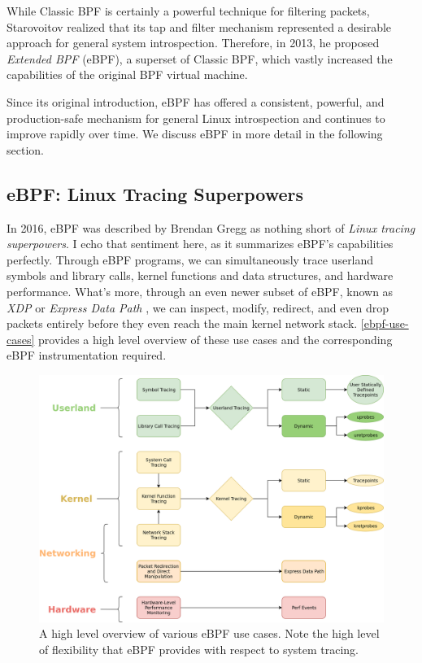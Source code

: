 \documentclass[
  12pt]{findlay}
\begin{document}
While Classic BPF is certainly a powerful technique for filtering
packets, Starovoitov \autocite{starovoitov13} realized that its tap and
filter mechanism represented a desirable approach for general system
introspection. Therefore, in 2013, he proposed \emph{Extended BPF}
(eBPF), a superset of Classic BPF, which vastly increased the
capabilities of the original BPF virtual machine.

Since its original introduction, eBPF has offered a consistent,
powerful, and production-safe mechanism for general Linux introspection
and continues to improve rapidly over time. We discuss eBPF in more
detail in the following section.

\hypertarget{ebpf-linux-tracing-superpowers}{%
\subsection{eBPF: Linux Tracing
Superpowers}\label{ebpf-linux-tracing-superpowers}}

\label{ebpf-superpowers}

In 2016, eBPF was described by Brendan Gregg \autocite{gregg16} as
nothing short of \emph{Linux tracing superpowers}. I echo that sentiment
here, as it summarizes eBPF's capabilities perfectly. Through eBPF
programs, we can simultaneously trace userland symbols and library
calls, kernel functions and data structures, and hardware performance.
What's more, through an even newer subset of eBPF, known as \emph{XDP}
or \emph{Express Data Path} \autocite{xdp}, we can inspect, modify,
redirect, and even drop packets entirely before they even reach the main
kernel network stack. \autoref{ebpf-use-cases} provides a high level
overview of these use cases and the corresponding eBPF instrumentation
required.

\begin{figure}
\includegraphics{../figures/eBPF-use-cases.png}
\caption[A high level overview of various eBPF use cases]{
A high level overview of various eBPF use cases.
Note the high level of flexibility that eBPF provides
with respect to system tracing.}
\label{ebpf-use-cases}
\end{figure}
\end{document}
